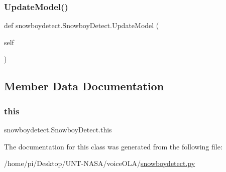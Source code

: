 \mbox{\label{classsnowboydetect_1_1SnowboyDetect_a5fe893dcbae408d4419b33b8f1c7db5a}} 
\subsubsection{\texorpdfstring{Update\+Model()}{UpdateModel()}}
{\footnotesize\ttfamily def snowboydetect.\+Snowboy\+Detect.\+Update\+Model (\begin{DoxyParamCaption}\item[{}]{self }\end{DoxyParamCaption})}



\subsection{Member Data Documentation}
\mbox{\label{classsnowboydetect_1_1SnowboyDetect_a1259775d218033e60489f0c00eac8eea}} 
\subsubsection{\texorpdfstring{this}{this}}
{\footnotesize\ttfamily snowboydetect.\+Snowboy\+Detect.\+this}



The documentation for this class was generated from the following file\+:\begin{DoxyCompactItemize}
\item 
/home/pi/\+Desktop/\+U\+N\+T-\/\+N\+A\+S\+A/voice\+O\+L\+A/\hyperlink{snowboydetect_8py}{snowboydetect.\+py}\end{DoxyCompactItemize}
